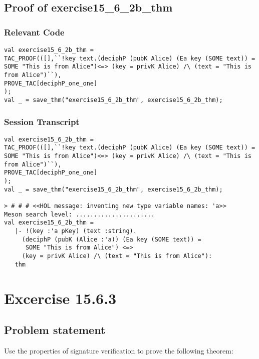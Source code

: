 \documentclass{report}
\begin{document}
\section{Proof of exercise15_6_2b_thm}
\label{proof-4}

\subsection{Relevant Code}
\label{rel-code-4}
\begin{lstlisting}[frame=TBlr]
val exercise15_6_2b_thm =
TAC_PROOF(([],``!key text.(deciphP (pubK Alice) (Ea key (SOME text)) = SOME "This is from Alice")<=> (key = privK Alice) /\ (text = "This is from Alice")``),
PROVE_TAC[deciphP_one_one]
);
val _ = save_thm("exercise15_6_2b_thm", exercise15_6_2b_thm);

\end{lstlisting}

\subsection{Session Transcript}
\label{trans4}
\begin{session}
  \begin{scriptsize}
\begin{verbatim}
val exercise15_6_2b_thm =
TAC_PROOF(([],``!key text.(deciphP (pubK Alice) (Ea key (SOME text)) = SOME "This is from Alice")<=> (key = privK Alice) /\ (text = "This is from Alice")``),
PROVE_TAC[deciphP_one_one]
);
val _ = save_thm("exercise15_6_2b_thm", exercise15_6_2b_thm);

> # # # <<HOL message: inventing new type variable names: 'a>>
Meson search level: ......................
val exercise15_6_2b_thm =
   |- !(key :'a pKey) (text :string).
     (deciphP (pubK (Alice :'a)) (Ea key (SOME text)) =
      SOME "This is from Alice") <=>
     (key = privK Alice) /\ (text = "This is from Alice"):
   thm
\end{verbatim}
  \end{scriptsize}
\end{session}


\chapter{Excercise 15.6.3}
\label{cha:15.6.3}

\section{Problem statement}
\label{problem-statement-3}
Use the properties of signature verification to prove the following theorem:
\begin{quote}
\HOLcryptoExercisesTheoremsexerciseOneFiveXXSixXXThreeXXthm
\end{quote}
\end{document}
